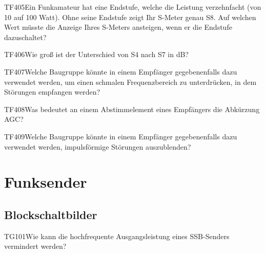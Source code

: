 \begin{question}{TF405}{Ein Funkamateur hat eine Endstufe, welche die Leistung verzehnfacht (von 10 auf 100 Watt). Ohne seine Endstufe zeigt Ihr S-Meter genau S8. Auf welchen Wert müsste die Anzeige Ihres S-Meters ansteigen, wenn er die Endstufe dazuschaltet?}
\end{question}

\begin{question}{TF406}{Wie groß ist der Unterschied von S4 nach S7 in dB?}
\end{question}

\begin{question}{TF407}{Welche Baugruppe könnte in einem Empfänger gegebenenfalls dazu verwendet werden, um einen schmalen Frequenzbereich zu unterdrücken, in dem Störungen empfangen werden?}
\end{question}

\begin{question}{TF408}{Was bedeutet an einem Abstimmelement eines Empfängers die Abkürzung AGC?}
\end{question}

\begin{question}{TF409}{Welche Baugruppe könnte in einem Empfänger gegebenenfalls dazu verwendet werden, impulsförmige Störungen auszublenden?}
\end{question}

\section{Funksender}

\subsection{Blockschaltbilder}

\begin{question}{TG101}{Wie kann die hochfrequente Ausgangsleistung eines SSB-Senders vermindert werden?}
\end{question}


